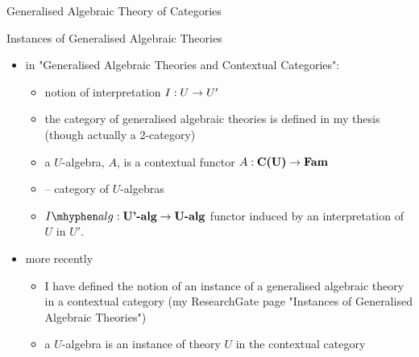 \begin{frame}{Generalised Algebraic Theory of Categories}
\footnotesize

\end{frame}

\begin{frame}{Instances of Generalised Algebraic Theories}
\begin{itemize}
\item in "Generalised Algebraic Theories and Contextual Categories":
\begin{itemize}
  \item notion of interpretation $I: U \rightarrow U'$ 
  \item the  category of  generalised algebraic theories 
      is defined in my thesis (though actually a 2-category)
  \item  a $U$-algebra, $A$, is a contextual functor $A: \textbf{C(U)} \rightarrow \textbf{Fam}$
  \item {} -- category of $U$-algebras
  \item $\Ialg: \cat{U'-alg} \morph \cat{U-alg}$ functor induced by an interpretation of $U$ in $U'$.
\end{itemize}
\item more recently 
\begin{itemize}
    \item I have defined the notion of an instance of a generalised algebraic theory in a contextual category
         (my ResearchGate page "Instances of Generalised Algebraic Theories")
    \item a $U$-algebra is an instance of theory $U$ in the contextual category 
\end{itemize}
\end{itemize}
\end{frame}




\newcommand{\USigmaA}{U_{\SigmaA}}
\newcommand{\USigmaAalg}{\USigmaA\mhyphen alg}
\newcommand{\SigmaA}{\Sigma A}

